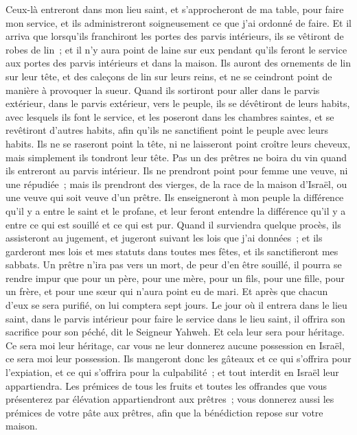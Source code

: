 \begin{multicols}{2}
Ceux-là entreront dans mon lieu saint, et s'approcheront de ma table, pour faire mon service, et ils administreront soigneusement ce que j'ai ordonné de faire.
Et il arriva que lorsqu'ils franchiront les portes des parvis intérieurs, ils se vêtiront de robes de lin~; et il n'y aura point de laine sur eux pendant qu'ils feront le service aux portes des parvis intérieurs et dans la maison.
Ils auront des ornements de lin sur leur tête, et des caleçons de lin sur leurs reins, et ne se ceindront point de manière à provoquer la sueur.
Quand ils sortiront pour aller dans le parvis extérieur, dans le parvis extérieur, vers le peuple, ils se dévêtiront de leurs habits, avec lesquels ils font le service, et les poseront dans les chambres saintes, et se revêtiront d'autres habits, afin qu'ils ne sanctifient point le peuple avec leurs habits.
Ils ne se raseront point la tête, ni ne laisseront point croître leurs cheveux, mais simplement ils tondront leur tête.
Pas un des prêtres ne boira du vin quand ils entreront au parvis intérieur.
Ils ne prendront point pour femme une veuve, ni une répudiée~; mais ils prendront des vierges, de la race de la maison d'Israël, ou une veuve qui soit veuve d'un prêtre.
Ils enseigneront à mon peuple la différence qu'il y a entre le saint et le profane, et leur feront entendre la différence qu'il y a entre ce qui est souillé et ce qui est pur.
Quand il surviendra quelque procès, ils assisteront au jugement, et jugeront suivant les lois que j'ai données~; et ils garderont mes lois et mes statuts dans toutes mes fêtes, et ils sanctifieront mes sabbats.
Un prêtre n'ira pas vers un mort, de peur d'en être souillé, il pourra se rendre impur que pour un père, pour une mère, pour un fils, pour une fille, pour un frère, et pour une sœur qui n'aura point eu de mari.
Et après que chacun d'eux se sera purifié, on lui comptera sept jours.
Le jour où il entrera dans le lieu saint, dans le parvis intérieur pour faire le service dans le lieu saint, il offrira son sacrifice pour son péché, dit le Seigneur Yahweh.
Et cela leur sera pour héritage. Ce sera moi leur héritage, car vous ne leur donnerez aucune possession en Israël, ce sera moi leur possession.
Ils mangeront donc les gâteaux et ce qui s'offrira pour l'expiation, et ce qui s'offrira pour la culpabilité~; et tout interdit en Israël leur appartiendra.
Les prémices de tous les fruits et toutes les offrandes que vous présenterez par élévation appartiendront aux prêtres~; vous donnerez aussi les prémices de votre pâte aux prêtres, afin que la bénédiction repose sur votre maison.

\end{multicols}
